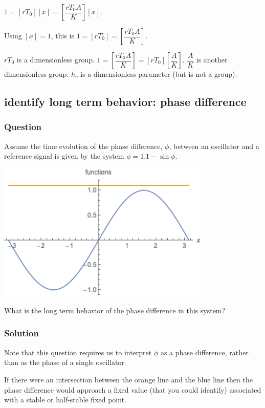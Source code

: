 \documentclass[12pt,letterpaper,noanswers]{exam}
\begin{document}
$1 = \left[r T_0\right]\left[x\right] = \left[\dfrac{r T_0 A}{K}\right]\left[ x\right]$.

Using $\left[x \right] = 1$, this is $1 = \left[r T_0\right] = \left[\dfrac{r T_0 A}{K}\right]$.

$rT_0$ is a dimensionless group.  $1 = \left[\dfrac{r T_0 A}{K}\right] = \left[rT_0\right]\left[\dfrac{A}{K}\right]$.  $\dfrac{A}{K}$ is another dimensionless group.  $h_v$ is a dimensionless parameter (but is not a group).

\subsection{identify long term behavior: phase difference}
\subsubsection{Question}

Assume the time evolution of the phase difference, $\phi$, between an oscillator and a reference signal is given by the system $\dot\phi = 1.1-\sin\phi$.

\includegraphics[width=4in]{img/C07-2019-09-18plot2.png}

What is the long term behavior of the phase difference in this system?


\subsubsection{Solution}

 Note that this question requires us to interpret $\phi$ as a phase difference, rather than as the phase of a single oscillator.

If there were an intersection between the orange line and the blue line then the phase difference would approach a fixed value (that you could identify) associated with a stable or half-stable fixed point.
\end{document}
